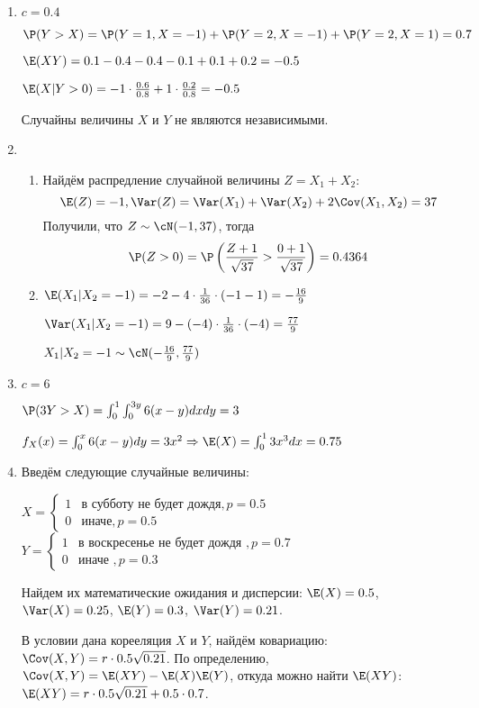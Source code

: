 \begin{enumerate}
\item $c = 0.4$

$\P(Y>X) = \P(Y=1, X=-1) + \P(Y=2, X=-1) + \P(Y=2, X=1) = 0.7$

$\E(XY) = 0.1 -0.4 - 0.4 -0.1 + 0.1 +0.2 =-0.5$

$\E(X|Y>0) = -1\cdot\frac{0.6}{0.8} + 1\cdot \frac{0.2}{0.8} = -0.5$

Случайны величины $X$ и $Y$ не являются независимыми.
\item
\begin{enumerate}
\item Найдём распредление случайной величины $Z = X_1 + X_2$:
\[
\E(Z) = -1, \Var(Z) = \Var(X_1) + \Var(X_2) + 2 \Cov(X_1, X_2) = 37
\]
Получили, что $Z \sim \cN(-1, 37)$, тогда
\[
\P(Z>0) = \P\left(\frac{Z+1}{\sqrt{37}} > \frac{0+1}{\sqrt{37}}\right) = 0.4364
\]
\item $\E(X_1 | X_2 = -1) = -2 -4 \cdot \frac{1}{36} \cdot (-1 -1) = -\frac{16}{9}$

$\Var(X_1 | X_2 = -1) = 9 - (-4) \cdot \frac{1}{36} \cdot (-4) = \frac{77}{9}$

$X_1 | X_2 = -1 \sim \cN(-\frac{16}{9}, \frac{77}{9})$
\end{enumerate}
\item $c=6$

$\P(3Y>X) = \int_{0}^{1} \int_{0}^{3y} 6(x-y) dx dy = 3$

$f_{X} (x) = \int_{0}^{x} 6(x-y) dy = 3x^2 \Rightarrow \E(X) = \int_{0}^{1} 3x^3 dx = 0.75$
\item Введём следующие случайные величины:

$
X = \begin{cases}
1 & \text{в субботу не будет дождя}, p=0.5 \\
0 & \text{иначе}, p=0.5
\end{cases}
$
\hspace{0.5cm}
$
Y = \begin{cases}
1 & \text{в воскресенье не будет дождя }, p=0.7 \\
0 & \text{иначе }, p=0.3
\end{cases}
$

Найдем их математические ожидания и дисперсии: $\E(X)=0.5$, $\Var(X)=0.25$,
$\E(Y)=0.3$, $\Var(Y)=0.21$.

В условии дана корееляция $X$ и $Y$, найдём ковариацию: $\Cov(X, Y) =
r \cdot 0.5 \sqrt{0.21}$.
По определению, $\Cov(X, Y) = \E(XY)-\E(X)\E(Y)$, откуда можно найти $\E(XY)$:
$\E(XY) = r \cdot 0.5 \sqrt{0.21} + 0.5 \cdot 0.7$.


\end{enumerate}
